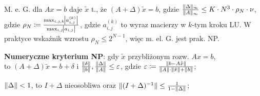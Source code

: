 \entry
M. e. G. dla $Ax=b$ daje $\tilde{x}$ t., że
$(A+\Delta) \tilde{x} = b$,
gdzie $\frac{\|\Delta\|_\infty}{\|A\|_\infty} \leq K\cdot N^3 \cdot \rho_N \cdot \nu$,
gdzie $\rho_N \coloneqq \frac{\max_{i,j,k}\abs{a_{i,j}^{(k)}}}{\max_{i,j} \abs{a_{i,j}}}$,
gdzie $a^{(k)}_{i,j}$ to wyraz macierzy w $k$-tym kroku LU. W praktyce wskaźnik wzrostu $\rho_N\leq 2^{N-1}$, więc m. el. G. jest prak. NP.

\entry
\textbf{Numeryczne kryterium NP}:
gdy $\tilde{x}$ przybliżonym rozw. $Ax=b$,\\
to $(A+\Delta)\tilde{x}=b+\delta$
i $\frac{\|\delta\|}{\|b\|}, \frac{\|\Delta\|}{\|A\|} \leq \varepsilon$,
gdzie $\varepsilon \coloneqq \frac{\|b-A\tilde{x}\|}{\|A\| \cdot \|\tilde{x}\| + \|b\| }$;


\entry
$\|\Delta\| < 1$,
to $I + \Delta$ nieosobliwa
oraz $\|(I + \Delta)^{-1}\| \leq \frac{1}{1 - \|\Delta\|}$;
